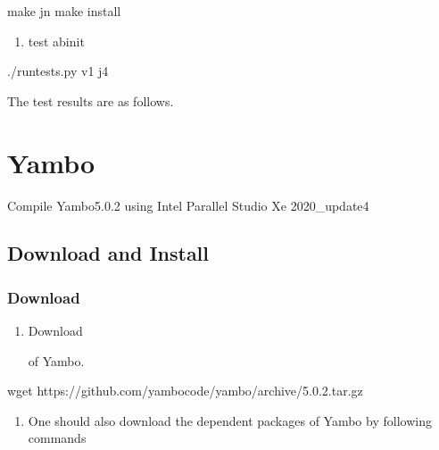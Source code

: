 \documentclass[a4paper,12pt,english]{sphinxmanual}
\begin{document}
\begin{sphinxVerbatim}[commandchars=\\\{\}]
make \PYGZhy{}j\PYGZlt{}n\PYGZgt{}  make install
\end{sphinxVerbatim}
\begin{enumerate}
%
\setcounter{enumi}{6}
\item {} 
\sphinxAtStartPar
test abinit

\end{enumerate}

\begin{sphinxVerbatim}[commandchars=\\\{\}]
./runtests.py v1 \PYGZhy{}j4
\end{sphinxVerbatim}

\sphinxAtStartPar
The test results are as follows.

\noindent{}


\section{Yambo}
\label{\detokenize{compile:yambo}}
\sphinxAtStartPar
Compile Yambo\sphinxhyphen{}5.0.2 using Intel Parallel Studio Xe 2020\_update4


\subsection{Download and Install}
\label{\detokenize{compile/yambo_5.0.2:download-and-install}}\label{\detokenize{compile/yambo_5.0.2::doc}}

\subsubsection{Download}
\label{\detokenize{compile/yambo_5.0.2:download}}\begin{enumerate}
%
\item {} 
\sphinxAtStartPar
Download %
\begin{footnote}[21]\sphinxAtStartFootnote
{}
%
\end{footnote} of Yambo.

\end{enumerate}

\begin{sphinxVerbatim}[commandchars=\\\{\}]
wget https://github.com/yambo\PYGZhy{}code/yambo/archive/5.0.2.tar.gz
\end{sphinxVerbatim}
\begin{enumerate}
%
\setcounter{enumi}{1}
\item {} 
\sphinxAtStartPar
One should also download the dependent packages of Yambo by following commands

\end{enumerate}
\end{document}
